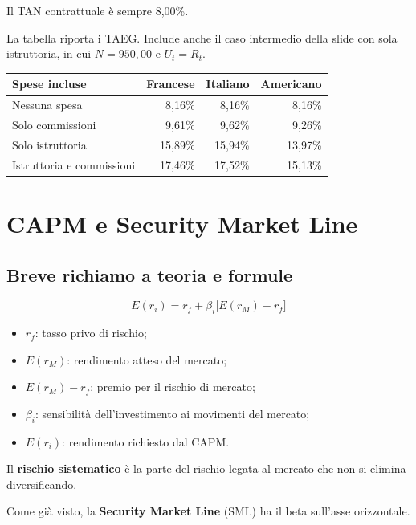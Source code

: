 \noindent Il TAN contrattuale è sempre 8,00\%.

\noindent La tabella riporta i TAEG.
Include anche il caso intermedio
della slide con sola istruttoria,
in cui $N=950{,}00$ e $U_t=R_t$.

\begin{center}
    \small
    \begin{tabular}{|l|r|r|r|}
        \hline
        \textbf{Spese incluse}
        & \textbf{Francese}
        & \textbf{Italiano}
        & \textbf{Americano} \\
        \hline
        Nessuna spesa & 8,16\% & 8,16\% & 8,16\% \\
        Solo commissioni & 9,61\% & 9,62\% & 9,26\% \\
        Solo istruttoria & 15,89\% & 15,94\% & 13,97\% \\
        Istruttoria e commissioni & 17,46\% & 17,52\% & 15,13\% \\
        \hline
    \end{tabular}
\end{center}
\newpage
\section{CAPM e Security Market Line}

\subsection*{Breve richiamo a teoria e formule}


\[
\boxed{
E(r_i)=r_f+\beta_i\bigl[E(r_M)-r_f\bigr]
}
\]

\begin{itemize}
    \item $r_f$: tasso privo di rischio;
    \item $E(r_M)$: rendimento atteso del mercato;
    \item $E(r_M)-r_f$: premio per il rischio di mercato;
    \item $\beta_i$: sensibilità dell'investimento
    ai movimenti del mercato;
    \item $E(r_i)$: rendimento richiesto dal CAPM.
\end{itemize}

\noindent Il \textbf{rischio sistematico}
è la parte del rischio legata al mercato
che non si elimina diversificando.

\noindent Come già visto,
la \textbf{Security Market Line} (SML)
ha il beta sull'asse orizzontale.

